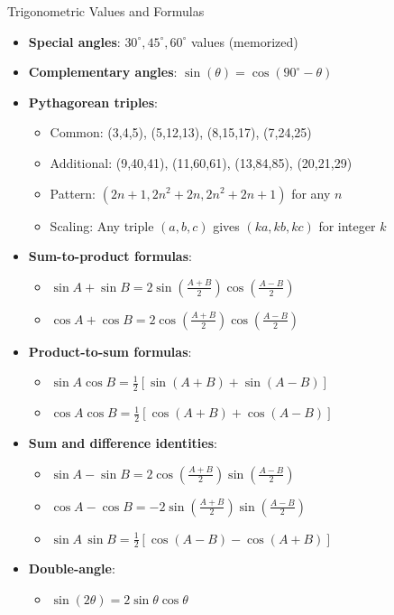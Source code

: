 \documentclass{article}
\begin{document}
\begin{mentalbox}{Trigonometric Values and Formulas}
\begin{itemize}
\item \textbf{Special angles}: $30^\circ, 45^\circ, 60^\circ$ values (memorized)
\item \textbf{Complementary angles}: $\sin(\theta) = \cos(90^\circ-\theta)$
\item \textbf{Pythagorean triples}: 
   \begin{itemize}[nosep]
   \item Common: (3,4,5), (5,12,13), (8,15,17), (7,24,25)
   \item Additional: (9,40,41), (11,60,61), (13,84,85), (20,21,29)
   \item Pattern: $(2n+1, 2n^2+2n, 2n^2+2n+1)$ for any $n$
   \item Scaling: Any triple $(a,b,c)$ gives $(ka,kb,kc)$ for integer $k$
   \end{itemize}
\item \textbf{Sum-to-product formulas}:
   \begin{itemize}[nosep]
   \item $\sin A + \sin B = 2\sin\left(\frac{A+B}{2}\right)\cos\left(\frac{A-B}{2}\right)$
   \item $\cos A + \cos B = 2\cos\left(\frac{A+B}{2}\right)\cos\left(\frac{A-B}{2}\right)$
   \end{itemize}
\item \textbf{Product-to-sum formulas}:
   \begin{itemize}[nosep]
   \item $\sin A \cos B = \frac{1}{2}[\sin(A+B) + \sin(A-B)]$
   \item $\cos A \cos B = \frac{1}{2}[\cos(A+B) + \cos(A-B)]$
   \end{itemize}
\item \textbf{Sum and difference identities}:
   \begin{itemize}[nosep]
   \item $\sin A - \sin B = 2\cos\!\left(\frac{A+B}{2}\right)\sin\!\left(\frac{A-B}{2}\right)$
   \item $\cos A - \cos B = -2\sin\!\left(\frac{A+B}{2}\right)\sin\!\left(\frac{A-B}{2}\right)$
   \item $\sin A\,\sin B = \tfrac{1}{2}[\cos(A-B) - \cos(A+B)]$
   \end{itemize}
\item \textbf{Double-angle}:
   \begin{itemize}[nosep]
   \item $\sin(2\theta) = 2\sin\theta\cos\theta$

\end{itemize}
\end{itemize}
\end{mentalbox}
\end{document}
